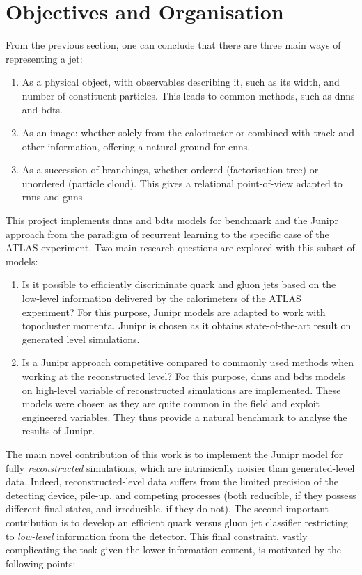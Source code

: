 \section{Objectives and Organisation}\label{Section:Obj}
From the previous section, one can conclude that there are three main ways of representing a jet: 
\begin{enumerate}
\item As a physical object, with observables describing it, such as its width, and number of constituent particles. This leads to common methods, such as \glspl{dnn} and \glspl{bdt}.
\item As an image: whether solely from the calorimeter or combined with track and other information, offering a natural ground for \glspl{cnn}. 
\item As a succession of branchings, whether ordered (factorisation tree) or unordered (particle cloud). This gives a relational point-of-view adapted to \glspl{rnn} and \glspl{gnn}.
\end{enumerate}
This project implements \glspl{dnn} and \glspl{bdt} models for benchmark and the Junipr approach from the paradigm of recurrent learning to the specific case of the ATLAS experiment. Two main research questions are explored with this subset of models: 
\begin{enumerate}
\item Is it possible to efficiently discriminate quark and gluon jets based on the low-level information delivered by the calorimeters of the ATLAS experiment? For this purpose, Junipr models are adapted to work with topocluster momenta. Junipr is chosen as it obtains state-of-the-art result on generated level simulations.
\item Is a Junipr approach competitive compared to commonly used methods when working at the reconstructed level? For this purpose, \glspl{dnn} and \glspl{bdt} models on high-level variable of reconstructed simulations are implemented. These models were chosen as they are quite common in the field and exploit engineered variables. They thus provide a natural benchmark to analyse the results of Junipr. 
\end{enumerate}
The main novel contribution of this work is to implement the Junipr model for fully \textit{reconstructed} simulations, which are intrinsically noisier than generated-level data. Indeed, reconstructed-level data suffers from the limited precision of the detecting device, pile-up, and competing processes (both reducible, if they possess different final states, and irreducible, if they do not). The second important contribution is to develop an efficient quark versus gluon jet classifier restricting to \textit{low-level} information from the detector. This final constraint, vastly complicating the task given the lower information content, is motivated by the following points: 
